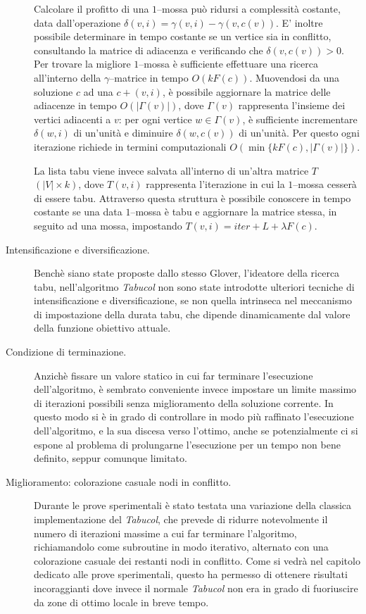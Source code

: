 \documentclass[a4paper,10pt]{article}
\newcommand{\tabucol}{\emph{Tabucol}}
\begin{document}
\begin{description}
Calcolare il profitto di una $1$--mossa può ridursi a complessità costante, data dall'operazione $\delta(v,i)=\gamma(v,i)-\gamma(v,c(v))$. E' inoltre possibile determinare in tempo costante se un vertice sia in conflitto, consultando la matrice di adiacenza e verificando che $\delta(v,c(v))>0$. Per trovare la migliore $1$--mossa è sufficiente effettuare una ricerca all'interno della $\gamma$--matrice in tempo $O(kF(c))$. Muovendosi da una soluzione $c$ ad una $c+(v,i)$, è possibile aggiornare la matrice delle adiacenze in tempo $O(|\Gamma(v)|)$, dove $\Gamma(v)$ rappresenta l'insieme dei vertici adiacenti a $v$: per ogni vertice $w\in \Gamma(v)$, è sufficiente incrementare $\delta(w,i)$ di un'unità e diminuire $\delta(w,c(v))$ di un'unità. Per questo ogni iterazione richiede in termini computazionali $O(\min \{kF(c),|\Gamma(v)|\})$.

La lista tabu viene invece salvata all'interno di un'altra matrice $T$ $(|V|\times k)$, dove $T(v,i)$ rappresenta l'iterazione in cui la $1$--mossa cesserà di essere tabu. Attraverso questa struttura è possibile conoscere in tempo costante se una data $1$--mossa è tabu e aggiornare la matrice stessa, in seguito ad una mossa, impostando $T(v,i) =iter+L+\lambda F(c)$.

\item[Intensificazione e diversificazione.] Benchè siano state proposte dallo stesso Glover, l'ideatore della ricerca tabu, nell'algoritmo \tabucol{} non sono state introdotte ulteriori tecniche di intensificazione e diversificazione, se non quella intrinseca nel meccanismo di impostazione della durata tabu, che dipende dinamicamente dal valore della funzione obiettivo attuale.

\item[Condizione di terminazione.] Anzichè fissare un valore statico in cui far terminare l'esecuzione dell'algoritmo, è sembrato conveniente invece impostare un limite massimo di iterazioni possibili senza miglioramento della soluzione corrente. In questo modo si è in grado di controllare in modo più raffinato l'esecuzione dell'algoritmo, e la sua discesa verso l'ottimo, anche se potenzialmente ci si espone al problema di prolungarne l'esecuzione per un tempo non bene definito, seppur comunque limitato.

\item[Miglioramento: colorazione casuale nodi in conflitto.] Durante le prove sperimentali è stato testata una variazione della classica implementazione del \tabucol{}, che prevede di ridurre notevolmente il numero di iterazioni massime a cui far terminare l'algoritmo, richiamandolo come subroutine in modo iterativo, alternato con una colorazione casuale dei restanti nodi in conflitto. Come si vedrà nel capitolo dedicato alle prove sperimentali, questo ha permesso di ottenere risultati incoraggianti dove invece il normale \tabucol{} non era in grado di fuoriuscire da zone di ottimo locale in breve tempo.
\end{description}
\end{document}
